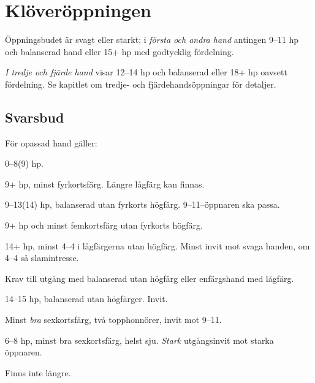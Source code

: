 \chapter{Kl\"over\"oppningen}

\"Oppningsbudet  \"ar svagt eller starkt; i {\em f\"orsta och andra hand}
antingen 9--11 hp och balanserad hand eller 15+ hp med godtycklig f\"ordelning.

{\em I tredje och fj{\"a}rde hand}
 visar  12--14 hp och balanserad eller 18+ hp oavsett fördelning.
Se kapitlet om tredje- och fj\"ardehands\"oppningar f\"or detaljer.

\section{Svarsbud}

F{\"o}r opassad hand g{\"a}ller:

\bbe
   \item[--\ru{1}] 0--8(9) hp.

   \item[--\ho{1}] 9+ hp, minst fyrkortsf\"arg. L\"angre l{\aa}gf\"arg 
                  kan finnas.

   \item[--\NT{1}] 9--13(14) hp, balanserad utan fyrkorts h\"ogf\"arg.
               9--11--\"oppnaren ska passa.

   \item[--\la{2}] 9+ hp och minst femkortsfärg utan fyrkorts högfärg.	
        

   \item[--\hj{2}] 14+ hp, minst 4--4 i lågfärgerna utan högfärg. Minst invit
     mot svaga handen, om 4--4 så slamintresse.

   \item[--\spa{2}] Krav till utgång med balanserad utan högfärg eller
     enfärgshand med lågfärg.

   \item[--\NT{2}] 14--15 hp, balanserad utan h\"ogf\"arger. Invit.

   \item[--\la{3}] Minst {\em bra} sexkortsf\"arg, två
     topphonnörer,
                  invit mot 9--11.

   \item[--\ho{3}] 6--8 hp, minst bra sexkortsf\"arg, helst sju. {\em Stark}
                    utg{\aa}ngsinvit mot starka \"oppnaren.

   \item[--\NT{3}] Finns inte längre.

